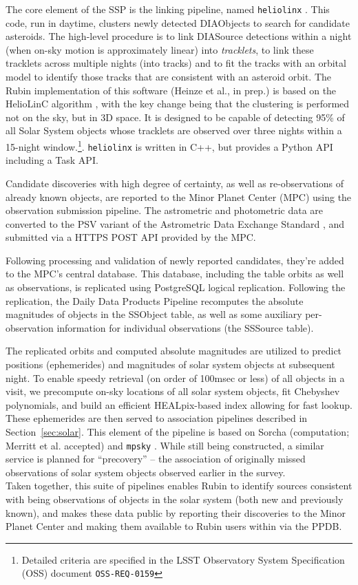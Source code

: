 The core element of the SSP is the linking pipeline, named {\tt heliolinx}
\citep{heliolinx}.  This code, run in daytime, clusters newly detected
DIAObjects to search for candidate asteroids.  The high-level procedure is
to link DIASource detections within a night (when on-sky motion is
approximately linear) into {\em tracklets}, to link these tracklets across
multiple nights (into tracks) and to fit the tracks with an orbital model to
identify those tracks that are consistent with an asteroid orbit.  The Rubin
implementation of this software (Heinze et al., in prep.) is based on the
HelioLinC algorithm \citep{2018AJ....156..135H}, with the key change being
that the clustering is performed not on the sky, but in 3D space.  It is
designed to be capable of detecting 95\% of all Solar System objects whose
tracklets are observed over three nights within a 15-night
window.\footnote{Detailed criteria are specified in the LSST Observatory
System Specification (OSS) document {\tt OSS-REQ-0159}}. {\tt heliolinx} is
written in C++, but provides a Python API including a Task API.

Candidate discoveries with high degree of certainty, as well as
re-observations of already known objects, are reported to the Minor Planet
Center (MPC) using the observation submission pipeline.  The astrometric
and photometric data are converted to the PSV variant of the Astrometric
Data Exchange Standard \citep[ADES;][]{2017DPS....4911214C}, and submitted
via a HTTPS POST API provided by the MPC.

Following processing and validation of newly reported candidates, they're
added to the MPC's central database.  This database, including the table
orbits as well as observations, is replicated using PostgreSQL logical
replication.  Following the replication, the Daily Data Products Pipeline
recomputes the absolute magnitudes of objects in the SSObject table, as well
as some auxiliary per-observation information for individual observations
(the SSSource table).

The replicated orbits and computed absolute magnitudes are utilized to
predict positions (ephemerides) and magnitudes of solar system objects at
subsequent night.  To enable speedy retrieval (on order of 100msec or less)
of all objects in a visit, we precompute on-sky locations of all solar
system objects, fit Chebyshev polynomials, and build an efficient
HEALpix-based index allowing for fast lookup.  These ephemerides are then
served to association pipelines described in Section~\ref{sec:solar}.  This
element of the pipeline is based on Sorcha (computation; Merritt et al. 
accepted) and {\tt mpsky} \citep[fast lookup and serving;][]{mpsky}.  While
still being constructed, a similar service is planned for ``precovery'' --
the association of originally missed observations of solar system objects
observed earlier in the survey.
\\

Taken together, this suite of pipelines enables Rubin to identify sources
consistent with being observations of objects in the solar system (both new
and previously known), and makes these data public by reporting their
discoveries to the Minor Planet Center and making them available to Rubin
users within via the PPDB.
